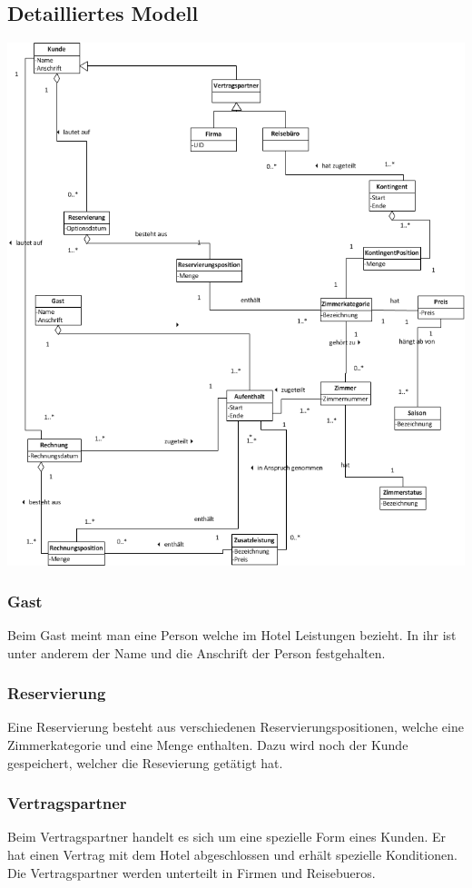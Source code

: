 \documentclass[10pt,a4paper,titlepage]{article}
\begin{document}
\subsection{Detailliertes Modell}
\includegraphics[width=\linewidth]{Images/Domaenenmodell.png}
\subsubsection{Gast}
Beim Gast meint man eine Person welche im Hotel Leistungen bezieht. In ihr ist unter anderem der Name und die Anschrift der Person festgehalten.
\subsubsection{Reservierung}
Eine Reservierung besteht aus verschiedenen Reservierungspositionen, welche eine Zimmerkategorie und eine Menge enthalten. Dazu wird noch der Kunde gespeichert, welcher die Resevierung getätigt hat.
\subsubsection{Vertragspartner}
Beim Vertragspartner handelt es sich um eine spezielle Form eines Kunden. Er hat einen Vertrag mit dem Hotel abgeschlossen und erhält spezielle Konditionen. Die Vertragspartner werden unterteilt in Firmen und \Glspl{Reisebuero}.
\end{document}
